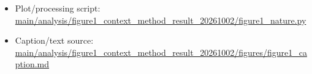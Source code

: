 \begin{itemize}[leftmargin=1.4em,noitemsep]
\item Plot/processing script: \begingroup\scriptsize\url{main/analysis/figure1_context_method_result_20261002/figure1_nature.py}\endgroup
\item Caption/text source: \begingroup\scriptsize\url{main/analysis/figure1_context_method_result_20261002/figures/figure1_caption.md}\endgroup
\end{itemize}
